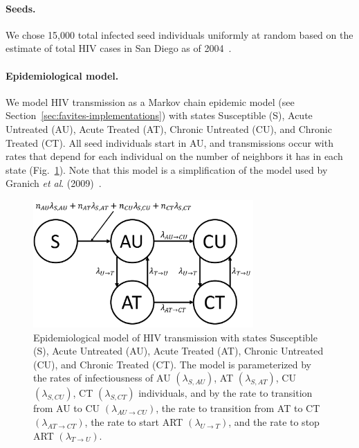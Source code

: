 \paragraph{Seeds.} We chose 15,000 total infected seed individuals uniformly at random based on the estimate of total \gls{HIV} cases in San Diego as of 2004~\cite{Macchione2015}.

\paragraph{Epidemiological model.} We model \gls{HIV} transmission as a Markov chain epidemic model (see Section~\ref{sec:favites-implementations}) with states Susceptible (S), Acute Untreated (AU), Acute Treated (AT), Chronic Untreated (CU), and Chronic Treated (CT). All seed individuals start in AU, and transmissions occur with rates that depend for each individual on the number of neighbors it has in each state (Fig.~\ref{fig:favites-model}). Note that this model is a simplification of the model used by Granich \textit{et al}. (2009)~\cite{Granich2009}.

\begin{figure}[ht] %
\centering
\includegraphics[width=0.75\textwidth]{figs/favites-model}
\caption[FAVITES Model]
{Epidemiological model of \gls{HIV} transmission with states Susceptible (S), Acute Untreated (AU), Acute Treated (AT), Chronic Untreated (CU), and Chronic Treated (CT). The model is parameterized by the rates of infectiousness of AU $(\lambda_{S,AU})$,  AT $(\lambda_{S,AT})$, CU $(\lambda_{S,CU})$, CT $(\lambda_{S,CT})$ individuals, and by the rate to transition from AU to CU $(\lambda_{AU \rightarrow CU})$, the rate to transition from AT to CT $(\lambda_{AT \rightarrow CT})$, the rate to start \gls{ART} $(\lambda_{U \rightarrow T})$, and the rate to stop ART $(\lambda_{T \rightarrow U})$.}
\label{fig:favites-model}
\end{figure}

